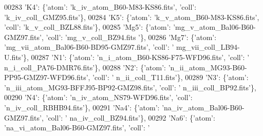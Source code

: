 \begin{DoxyCode}
00283                              \textcolor{stringliteral}{'K4'}: \{\textcolor{stringliteral}{'atom'}: \textcolor{stringliteral}{'k\_iv\_atom\_B60-M83-KS86.fits'}, \textcolor{stringliteral}{'coll'}: \textcolor{stringliteral}{'k\_iv\_coll\_GMZ95.fits'}\},
00284                              \textcolor{stringliteral}{'K5'}: \{\textcolor{stringliteral}{'atom'}: \textcolor{stringliteral}{'k\_v\_atom\_B60-M83-KS86.fits'}, \textcolor{stringliteral}{'coll'}: \textcolor{stringliteral}{'k\_v\_coll\_BZL88.fits'}\},
00285                              \textcolor{stringliteral}{'Mg5'}: \{\textcolor{stringliteral}{'atom'}: \textcolor{stringliteral}{'mg\_v\_atom\_Bal06-B60-GMZ97.fits'}, \textcolor{stringliteral}{'coll'}: \textcolor{stringliteral}{'mg\_v\_coll\_BZ94.fits
      '}\},
00286                              \textcolor{stringliteral}{'Mg7'}: \{\textcolor{stringliteral}{'atom'}: \textcolor{stringliteral}{'mg\_vii\_atom\_Bal06-B60-BD95-GMZ97.fits'}, \textcolor{stringliteral}{'coll'}: \textcolor{stringliteral}{'
      mg\_vii\_coll\_LB94-U.fits'}\},
00287                              \textcolor{stringliteral}{'N1'}: \{\textcolor{stringliteral}{'atom'}: \textcolor{stringliteral}{'n\_i\_atom\_B60-KS86-F75-WFD96.fits'}, \textcolor{stringliteral}{'coll'}: \textcolor{stringliteral}{'
      n\_i\_coll\_PA76-DMR76.fits'}\},
00288                              \textcolor{stringliteral}{'N2'}: \{\textcolor{stringliteral}{'atom'}: \textcolor{stringliteral}{'n\_ii\_atom\_MG93-B60-PP95-GMZ97-WFD96.fits'}, \textcolor{stringliteral}{'coll'}: \textcolor{stringliteral}{'
      n\_ii\_coll\_T11.fits'}\},
00289                              \textcolor{stringliteral}{'N3'}: \{\textcolor{stringliteral}{'atom'}: \textcolor{stringliteral}{'n\_iii\_atom\_MG93-BFFJ95-BP92-GMZ98.fits'}, \textcolor{stringliteral}{'coll'}: \textcolor{stringliteral}{'
      n\_iii\_coll\_BP92.fits'}\},
00290                              \textcolor{stringliteral}{'N4'}: \{\textcolor{stringliteral}{'atom'}: \textcolor{stringliteral}{'n\_iv\_atom\_NS79-WFD96.fits'}, \textcolor{stringliteral}{'coll'}: \textcolor{stringliteral}{'n\_iv\_coll\_RBHB94.fits'}\},
00291                              \textcolor{stringliteral}{'Na4'}: \{\textcolor{stringliteral}{'atom'}: \textcolor{stringliteral}{'na\_iv\_atom\_Bal06-B60-GMZ97.fits'}, \textcolor{stringliteral}{'coll'}: \textcolor{stringliteral}{'
      na\_iv\_coll\_BZ94.fits'}\},
00292                              \textcolor{stringliteral}{'Na6'}: \{\textcolor{stringliteral}{'atom'}: \textcolor{stringliteral}{'na\_vi\_atom\_Bal06-B60-GMZ97.fits'}, \textcolor{stringliteral}{'coll'}: \textcolor{stringliteral}{'
}
\end{DoxyCode}
